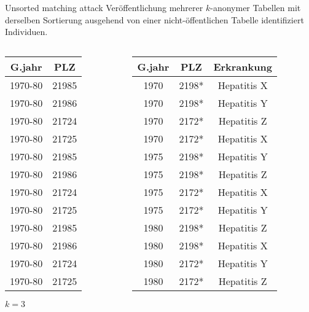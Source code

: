 \begin{frame} {Unsorted matching attack}
	Veröffentlichung mehrerer \(k\)-anonymer Tabellen mit derselben Sortierung ausgehend von einer nicht-öffentlichen Tabelle  identifiziert Individuen.
	\begin{columns}[T] 
	     \begin{column}[T]{0.5\textwidth} 
			\centering
			\footnotesize
			\begin{tabular}{|c|c|}
			\hline \textbf{G.jahr} & \textbf{PLZ} \\
			\hline 1970-80 & 21985 \\ 
			\hline 1970-80 & 21986 \\ 
			\hline 1970-80 & 21724 \\ 
			\hline 1970-80 & 21725 \\ 
			\hline \rowcolor{svsgrau1}1970-80 & 21985 \\ 
			\hline 1970-80 & 21986 \\ 
			\hline 1970-80 & 21724 \\ 
			\hline 1970-80 & 21725 \\ 
			\hline 1970-80 & 21985 \\ 
			\hline 1970-80 & 21986 \\ 
			\hline 1970-80 & 21724 \\ 
			\hline 1970-80 & 21725 \\ 
			\hline 
			\end{tabular}
			\vspace{0.3cm}

			\(k = 3\)
	     \end{column}
	
	     \begin{column}[T]{0.5\textwidth} 
			\centering
			\footnotesize
			\begin{tabular}{|c|c|c|}
			\hline \textbf{G.jahr} & \textbf{PLZ} & \textbf{Erkrankung} \\
			\hline 1970 & 2198* & Hepatitis X \\ 
			 1970 & 2198* & Hepatitis Y \\ 
			\hline 1970 & 2172* & Hepatitis Z \\ 
			 1970 & 2172* & Hepatitis X \\ 
			\hline \rowcolor{svsgrau1} 1975 & 2198* & Hepatitis Y \\ 
			 1975 & 2198* & Hepatitis Z \\ 
			\hline 1975 & 2172* & Hepatitis X \\ 
			 1975 & 2172* & Hepatitis Y \\ 
			\hline 1980 & 2198* & Hepatitis Z \\ 
			 1980 & 2198* & Hepatitis X \\ 
			\hline 1980 & 2172* & Hepatitis Y \\ 
			 1980 & 2172* & Hepatitis Z \\ 
			\hline 
			\end{tabular}
			\vspace{0.3cm}


\end{column}
\end{columns}
\end{frame}
